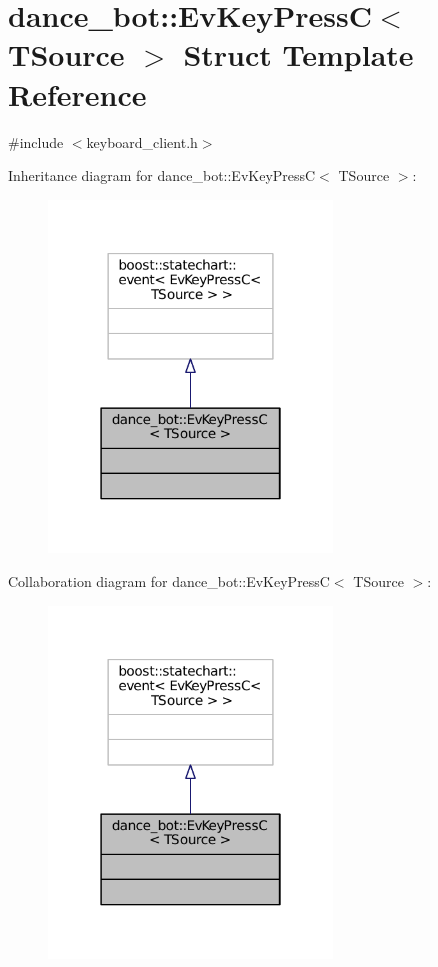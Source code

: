 \hypertarget{structdance__bot_1_1EvKeyPressC}{}\section{dance\+\_\+bot\+:\+:Ev\+Key\+PressC$<$ T\+Source $>$ Struct Template Reference}
\label{structdance__bot_1_1EvKeyPressC}


{\ttfamily \#include $<$keyboard\+\_\+client.\+h$>$}



Inheritance diagram for dance\+\_\+bot\+:\+:Ev\+Key\+PressC$<$ T\+Source $>$\+:
\nopagebreak
\begin{figure}[H]
\begin{center}
\leavevmode
\includegraphics[width=214pt]{structdance__bot_1_1EvKeyPressC__inherit__graph}
\end{center}
\end{figure}


Collaboration diagram for dance\+\_\+bot\+:\+:Ev\+Key\+PressC$<$ T\+Source $>$\+:
\nopagebreak
\begin{figure}[H]
\begin{center}
\leavevmode
\includegraphics[width=214pt]{structdance__bot_1_1EvKeyPressC__coll__graph}
\end{center}
\end{figure}


